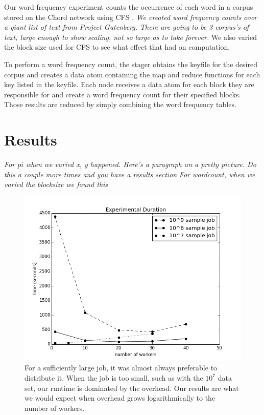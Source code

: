 Our word frequency experiment counts the occurrence of each word in a corpus stored on the Chord network using CFS \cite{CFS}. \textit{We created word frequency counts over a giant list of text from Project Gutenberg.   There are going to be 3 corpus's of text, large enough to show scaling, not so large as to take forever.}   We also varied the block size used for CFS to see what effect that had on computation.  

To perform a word frequency count, the stager obtains the keyfile for the desired corpus and creates a data atom containing the map and reduce functions for each key listed in the keyfile.  Each node receives a data atom for each block they are responsible for and create a word frequency count for their specified blocks.  Those results are reduced by simply combining the word frequency tables. 

\section{Results}

\textit{For $pi$  when we varied x, y happened.  Here's a paragraph an a pretty picture.  Do this a couple more times and you have a results section }\textit{For wordcount, when we varied the blocksize we found this}


\begin{figure}
    \includegraphics[width=\linewidth]{expTime}
    \caption{For a sufficiently large job, it was almost always preferable to distribute it.  When the job is too small, such as with the $10^{7}$ data set, our runtime is dominated by the overhead.  Our results are what we would expect when overhead grows logarithmically to the number of workers.}
    \label{expTime}
\end{figure}


